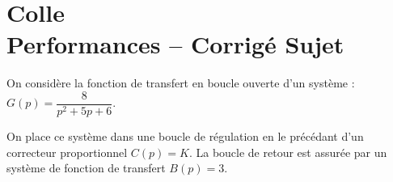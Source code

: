 \chapter*{Colle  \\
 Performances -- \ifprof Corrigé \else Sujet \fi}


\iflivret {} \else
\ifprof  {} \else \fi
\fi
\setcounter{question}{0}








On considère la fonction de transfert en boucle ouverte d’un système : $G(p)=\dfrac{8}{p^2+5p+6}$.

\ifprof
\begin{corrige}
\end{corrige}
\else
\fi

\ifprof
\begin{corrige}
\end{corrige}
\else
\fi

\ifprof
\begin{corrige}
\end{corrige}
\else
\fi

On place ce système dans une boucle de régulation en le précédant d’un correcteur proportionnel $C(p)=K$. La boucle de retour est assurée par un système de fonction de transfert $B(p)=3$.

\ifprof
\begin{corrige}
\end{corrige}
\else
\fi

\ifprof
\begin{corrige}
\end{corrige}
\else
\fi

